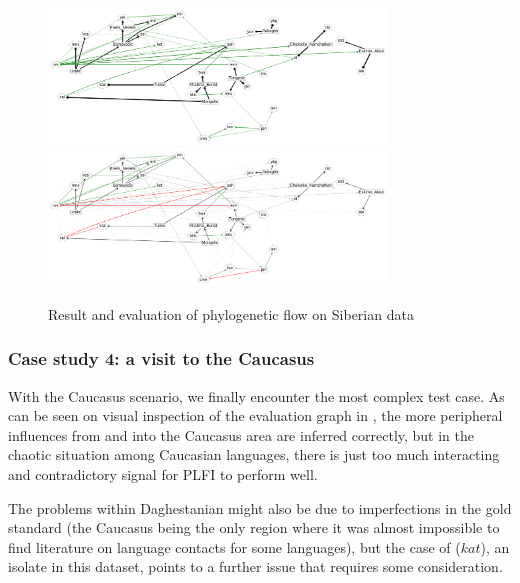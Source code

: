 \begin{figure}
 \includegraphics[width=0.8\textwidth]{figures/siberia-fs-ufr-ml-multi.pdf}
 \vspace*{5mm}
 \includegraphics[width=0.8\textwidth]{figures/siberia-fs-ufr-ml-multi-eval.pdf}
 \caption{Result and evaluation of phylogenetic flow on Siberian data}
 \label{siberia-result-phylo}
\end{figure}

\subsubsection{Case study 4: a visit to the Caucasus}
With the Caucasus scenario, we finally encounter the most complex test case. As can be seen on visual inspection of the evaluation graph in , the more peripheral influences from  and  into the Caucasus area are inferred correctly, but in the chaotic situation among Caucasian languages, there is just too much interacting and contradictory signal for PLFI to perform well.
 
The problems within Daghestanian might also be due to imperfections in the gold standard (the Caucasus being the only region where it was almost impossible to find literature on language contacts for some languages), but the case of  ($kat$), an isolate in this dataset, points to a further issue that requires some consideration.
 

